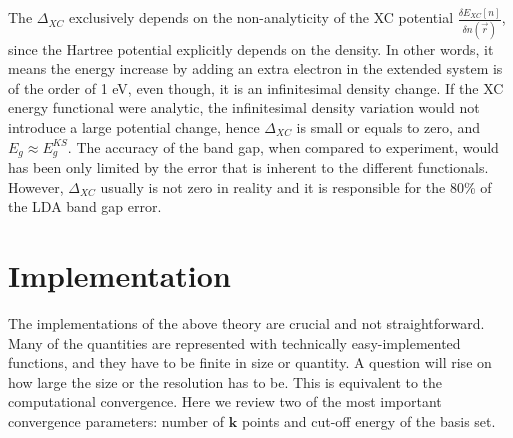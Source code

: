 The $\Delta_{XC}$ exclusively depends on the non-analyticity of the XC potential $\frac{\delta E_{XC}[n]}{\delta n(\vec{r})}$, since the Hartree potential explicitly depends on the density. In other words, it means the energy increase by adding an extra electron in the extended system is of the order of 1 eV, even though, it is an infinitesimal density change. If the XC energy functional were analytic, the infinitesimal density variation would not introduce a large potential change, hence $\Delta_{XC}$ is small or equals to zero, and $E_g \approx E^{KS}_g$. The accuracy of the band gap, when compared to experiment, would has been only limited by the error that is inherent to the different functionals. However, $\Delta_{XC}$ usually is not zero in reality and it is responsible for the 80\% of the LDA band gap error\cite{Godby1988}. 
\section{Implementation}
The implementations of the above theory are crucial and not straightforward. Many of the quantities are represented with technically easy-implemented functions, and they have to be finite in size or quantity. A question will rise on how large the size or the resolution has to be. This is equivalent to the computational convergence. Here we review two of the most important convergence parameters: number of $\mathbf{k}$ points and cut-off energy of the basis set.
